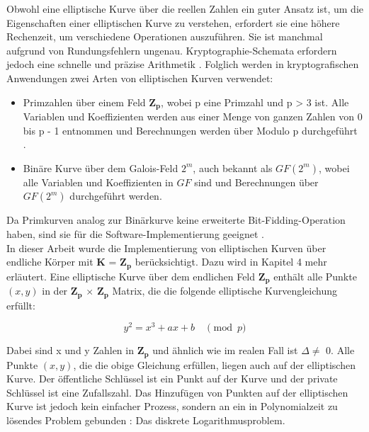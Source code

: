 Obwohl eine elliptische Kurve über die reellen Zahlen ein guter Ansatz ist, um die Eigenschaften einer elliptischen Kurve zu verstehen, erfordert sie eine höhere Rechenzeit, um verschiedene Operationen auszuführen. Sie ist manchmal aufgrund von Rundungsfehlern ungenau. Kryptographie-Schemata erfordern jedoch eine schnelle und präzise Arithmetik \cite{razad}. Folglich werden in kryptografischen Anwendungen zwei Arten von elliptischen Kurven verwendet:
	\begin{itemize}
	    \item Primzahlen über einem Feld $ \mathbf{Z_p} $, wobei p eine Primzahl und p > 3 ist. Alle Variablen und Koeffizienten werden aus einer Menge von ganzen Zahlen von 0 bis p - 1 entnommen und Berechnungen werden über Modulo p durchgeführt \cite{werner}.
        \item 	Binäre Kurve über dem Galois-Feld $ 2^m $, auch bekannt als $ GF(2^m) $, wobei alle Variablen und Koeffizienten in $ GF $ sind und Berechnungen über $ GF(2^m) $ durchgeführt werden.
	\end{itemize}

Da Primkurven analog zur Binärkurve keine erweiterte Bit-Fidding-Operation haben, sind sie für die Software-Implementierung geeignet \cite{razad}.\\



In dieser Arbeit wurde die Implementierung von elliptischen Kurven über endliche Körper mit $ \mathbf{K} $ = $ \mathbf{Z_p} $ berücksichtigt. Dazu wird in Kapitel 4 mehr erläutert.
Eine elliptische Kurve über dem endlichen Feld $ \mathbf{Z_p} $ enthält alle Punkte $ (x, y) $ in der $ \mathbf{Z_p} $ $ \times $ $ \mathbf{Z_p} $ Matrix, die die folgende elliptische Kurvengleichung erfüllt: 

\begin{ceqn}

\begin{equation}
     y^2 = x^3 + ax + b  \quad \pmod p
     \label{curve}
\end{equation}

\end{ceqn}

Dabei sind x und y Zahlen in $ \mathbf{Z_p} $  und ähnlich wie im realen Fall ist $ \Delta \neq $ 0.
Alle Punkte $ (x, y) $, die die obige Gleichung  erfüllen, liegen auch auf der elliptischen Kurve. Der öffentliche Schlüssel ist ein Punkt auf der Kurve und der private Schlüssel ist eine Zufallszahl. Das Hinzufügen von Punkten auf der elliptischen Kurve ist jedoch kein einfacher Prozess, sondern an ein in Polynomialzeit zu lösendes Problem gebunden \cite{mo2014}: Das diskrete Logarithmusproblem. 


